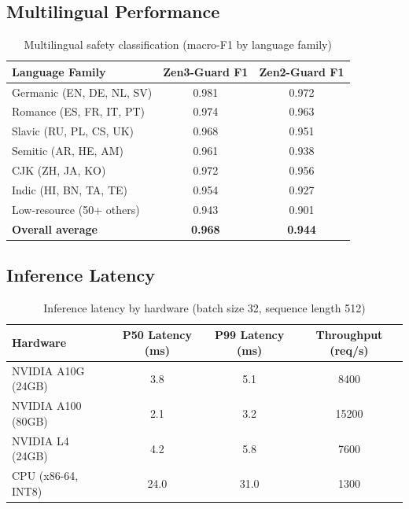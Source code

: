 \documentclass[11pt,a4paper]{article}
\begin{document}
\subsection{Multilingual Performance}

\begin{table}[H]
\centering
\caption{Multilingual safety classification (macro-F1 by language family)}
\begin{tabular}{lcc}
\toprule
\textbf{Language Family} & \textbf{Zen3-Guard F1} & \textbf{Zen2-Guard F1} \\
\midrule
Germanic (EN, DE, NL, SV)   & 0.981 & 0.972 \\
Romance (ES, FR, IT, PT)    & 0.974 & 0.963 \\
Slavic (RU, PL, CS, UK)     & 0.968 & 0.951 \\
Semitic (AR, HE, AM)        & 0.961 & 0.938 \\
CJK (ZH, JA, KO)            & 0.972 & 0.956 \\
Indic (HI, BN, TA, TE)      & 0.954 & 0.927 \\
Low-resource (50+ others)   & 0.943 & 0.901 \\
\textbf{Overall average}    & \textbf{0.968} & \textbf{0.944} \\
\bottomrule
\end{tabular}
\label{tab:multilingual}
\end{table}

\subsection{Inference Latency}

\begin{table}[H]
\centering
\caption{Inference latency by hardware (batch size 32, sequence length 512)}
\begin{tabular}{lccc}
\toprule
\textbf{Hardware} & \textbf{P50 Latency (ms)} & \textbf{P99 Latency (ms)} & \textbf{Throughput (req/s)} \\
\midrule
NVIDIA A10G (24GB)   & 3.8  & 5.1  & 8400  \\
NVIDIA A100 (80GB)   & 2.1  & 3.2  & 15200 \\
NVIDIA L4 (24GB)     & 4.2  & 5.8  & 7600  \\
CPU (x86-64, INT8)   & 24.0 & 31.0 & 1300  \\
\bottomrule
\end{tabular}
\label{tab:latency}
\end{table}
\end{document}
